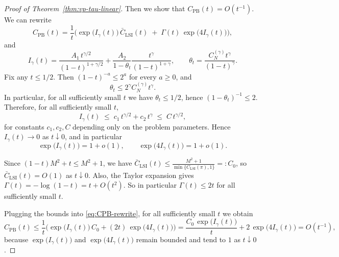 \documentclass[12pt]{article}
\theoremstyle{definition} %
\begin{document}
\begin{proof}[Proof of Theorem~\ref{thm:vp-tau-linear}]
Then we show that $C_{\mathrm{PB}}(t)=O(t^{-1})$.
We can rewrite
\begin{equation}\label{eq:CPB-rewrite}
C_{\mathrm{PB}}(t)=\frac{1}{t}\Big(\exp\!\big(I_\gamma(t)\big)\,\bar C_{\mathrm{LSI}}(t)\;+\;\Gamma(t)\,\exp\!\big(4I_\gamma(t)\big)\Big),
\end{equation}
and
\[
I_\gamma(t)=\frac{A_1\,t^{\gamma/2}}{(1-t)^{1+\gamma/2}}
+\frac{A_2}{1-\theta_t}\frac{t^\gamma}{(1-t)^{1+\gamma}},
\qquad
\theta_t=\frac{C_N^{(\gamma)}t^\gamma}{(1-t)^\gamma}.
\]
Fix any $t\le 1/2$. Then $(1-t)^{-a}\le 2^a$ for every $a\ge 0$, and
\[
\theta_t \le 2^\gamma C_N^{(\gamma)} t^\gamma.
\]
In particular, for all sufficiently small $t$ we have $\theta_t\le 1/2$, hence $(1-\theta_t)^{-1}\le 2$.
Therefore, for all sufficiently small $t$,
\[
I_\gamma(t)\;\le\; c_1\,t^{\gamma/2}+c_2\,t^\gamma\;\le\; C\,t^{\gamma/2},
\]
for constants $c_1,c_2,C$ depending only on the problem parameters. Hence $I_\gamma(t)\to 0$ as $t\downarrow 0$,
and in particular
\[
\exp\!\big(I_\gamma(t)\big)=1+o(1),\qquad \exp\!\big(4I_\gamma(t)\big)=1+o(1).
\]

Since $(1-t)M^2+t\le M^2+1$, we have
$\bar C_{\mathrm{LSI}}(t)\le \frac{M^2+1}{\min\{C_{\mathrm{LSI}}(\pi),1\}}=:C_0$,
so $\bar C_{\mathrm{LSI}}(t)=O(1)$ as $t\downarrow 0$.
Also, the Taylor expansion gives $\Gamma(t)=-\log(1-t)=t+O(t^2)$.
So in particular $\Gamma(t)\le 2t$ for all sufficiently small $t$.

Plugging the bounds into \eqref{eq:CPB-rewrite}, for all sufficiently small $t$ we obtain
\[
C_{\mathrm{PB}}(t)
\le \frac{1}{t}\Big(\exp\!\big(I_\gamma(t)\big)\,C_0 + (2t)\,\exp\!\big(4I_\gamma(t)\big)\Big)
= \frac{C_0\,\exp\!\big(I_\gamma(t)\big)}{t} + 2\,\exp\!\big(4I_\gamma(t)\big)
= O(t^{-1}),
\]
because $\exp\!\big(I_\gamma(t)\big)$ and $\exp\!\big(4I_\gamma(t)\big)$ remain bounded and tend to $1$ as $t\downarrow 0$.
\end{proof}

\bigskip
\end{document}
